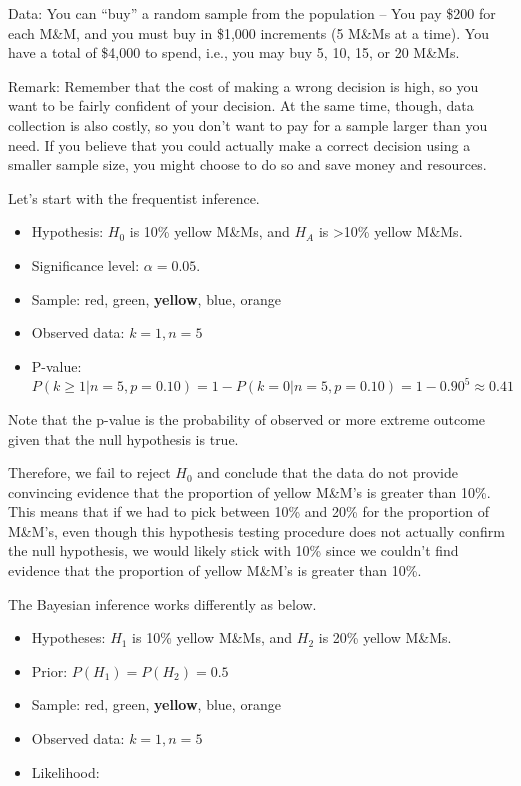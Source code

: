 \documentclass[]{book}
\theoremstyle{definition}
\theoremstyle{definition}
\theoremstyle{definition}
\theoremstyle{remark}
\begin{document}
Data: You can ``buy'' a random sample from the population -- You pay
\$200 for each M\&M, and you must buy in \$1,000 increments (5 M\&Ms at
a time). You have a total of \$4,000 to spend, i.e., you may buy 5, 10,
15, or 20 M\&Ms.

Remark: Remember that the cost of making a wrong decision is high, so
you want to be fairly confident of your decision. At the same time,
though, data collection is also costly, so you don't want to pay for a
sample larger than you need. If you believe that you could actually make
a correct decision using a smaller sample size, you might choose to do
so and save money and resources.

Let's start with the frequentist inference.

\begin{itemize}
\item
  Hypothesis: \(H_0\) is 10\% yellow M\&Ms, and \(H_A\) is
  \textgreater{}10\% yellow M\&Ms.
\item
  Significance level: \(\alpha = 0.05\).
\item
  Sample: red, green, \textbf{yellow}, blue, orange
\item
  Observed data: \(k=1, n=5\)
\item
  P-value:
  \(P(k \geq 1 | n=5, p=0.10) = 1 - P(k=0 | n=5, p=0.10) = 1 - 0.90^5 \approx 0.41\)
\end{itemize}

Note that the p-value is the probability of observed or more extreme
outcome given that the null hypothesis is true.

Therefore, we fail to reject \(H_0\) and conclude that the data do not
provide convincing evidence that the proportion of yellow M\&M's is
greater than 10\%. This means that if we had to pick between 10\% and
20\% for the proportion of M\&M's, even though this hypothesis testing
procedure does not actually confirm the null hypothesis, we would likely
stick with 10\% since we couldn't find evidence that the proportion of
yellow M\&M's is greater than 10\%.

The Bayesian inference works differently as below.

\begin{itemize}
\item
  Hypotheses: \(H_1\) is 10\% yellow M\&Ms, and \(H_2\) is 20\% yellow
  M\&Ms.
\item
  Prior: \(P(H_1) = P(H_2) = 0.5\)
\item
  Sample: red, green, \textbf{yellow}, blue, orange
\item
  Observed data: \(k=1, n=5\)
\item
  Likelihood:
\end{itemize}
\end{document}
